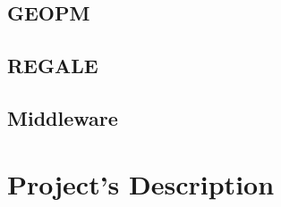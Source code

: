 \subsection{GEOPM}
\subsection{REGALE}
\subsection{Middleware}




\section{Project’s Description} \label{SEC:pd}




